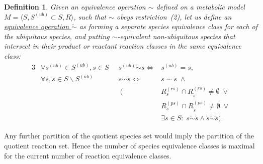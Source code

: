 \documentclass[10pt]{bmc_article}
\newenvironment{bmcformat}{\baselineskip20pt\sloppy\setboolean{publ}{false}}{\baselineskip20pt\sloppy}
\begin{document}
\begin{bmcformat}
\newtheorem{eq1}[def]{Definition}\label{equiv1}
\begin{eq1}
Given an equivalence operation $\sim$ defined on a metabolic model $M=\langle S, S^{(ub)}\subset{S}, R \rangle$, such that $\sim$ obeys restriction~(2), let us define an \underline{equivalence operation $\tilde{\sim}$} as forming a separate species equivalence class for each of the ubiquitous species, and putting $\sim$-equivalent non-ubiquitous species that intersect in their product or reactant reaction classes in the same equivalence class:
\begin{alignat*}{3}
& \forall s^{(ub)} \in S^{(ub)}, s \in S \;\; & s^{(ub)} \tilde{\sim} s \iff & s^{(ub)} = s, \\
& \forall s, \tilde{s} \in S \backslash S^{(ub)} \; & s \tilde{\sim} \tilde{s} \iff 
& s \sim \tilde{s}\;\land \\
& ~ &  ~  (&R^{(rs)}_s \cap R^{(rs)}_{\tilde{s}} \neq \emptyset\;\lor \\
& ~ &  ~ & R^{(ps)}_s \cap R^{(ps)}_{\tilde{s}} \neq \emptyset\;\lor \\
& ~ &  ~ & \exists \dot{s} \in S:\; s \tilde{\sim} \dot{s} \land \dot{s} \tilde{\sim} \tilde{s}). 
\end{alignat*}
\end{eq1}

Any further partition of the quotient species set would imply the partition of the quotient reaction set. Hence the number of species equivalence classes is maximal for the current number of reaction equivalence classes. 


\end{bmcformat}
\end{document}
